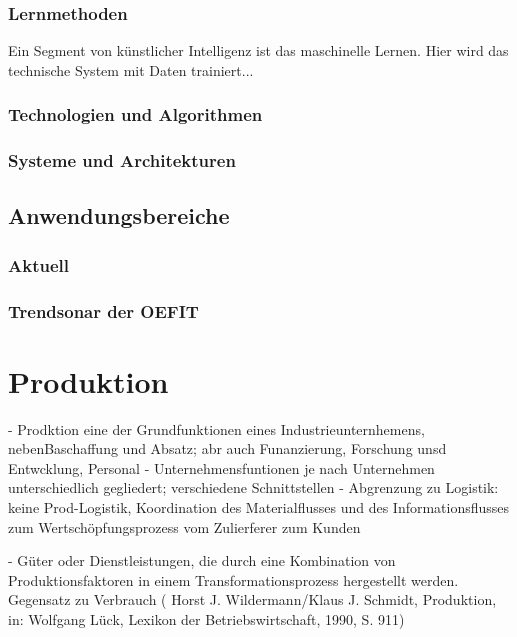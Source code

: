 \documentclass[a4paper,12pt, german]{report}
\begin{document}
\subsubsection{Lernmethoden}

Ein Segment von künstlicher Intelligenz ist das maschinelle Lernen. Hier wird das technische System mit Daten trainiert...

\subsubsection{Technologien und Algorithmen}

\subsubsection{Systeme und Architekturen}


\subsection{Anwendungsbereiche}

\subsubsection{Aktuell}

\subsubsection{Trendsonar der OEFIT}



\section{Produktion}

- Prodktion eine der Grundfunktionen eines Industrieunternhemens, nebenBaschaffung und Absatz; abr auch Funanzierung, Forschung unsd Entwcklung, Personal 
- Unternehmensfuntionen je nach Unternehmen unterschiedlich gegliedert; verschiedene Schnittstellen
- Abgrenzung zu Logistik: keine Prod-Logistik, Koordination des Materialflusses und des Informationsflusses zum Wertschöpfungsprozess vom Zulierferer zum Kunden
\cite{07}

- Güter oder Dienstleistungen, die durch eine Kombination von Produktionsfaktoren in einem Transformationsprozess hergestellt werden. Gegensatz zu Verbrauch ( Horst J. Wildermann/Klaus J. Schmidt, Produktion, in: Wolfgang Lück, Lexikon der Betriebswirtschaft, 1990, S. 911)
\end{document}

